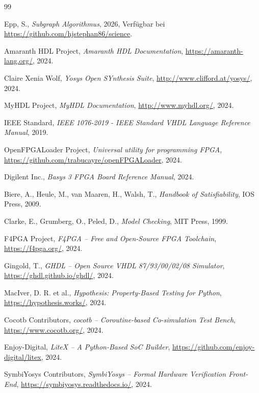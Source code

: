 ﻿\documentclass[12pt,a4paper]{report}
\begin{document}
\begin{thebibliography}{99}

  Epp, S.,
  \textit{Subgraph Algorithmus},
  2026, Verfügbar bei \url{https://github.com/hjstephan86/science}.

  Amaranth HDL Project,
  \textit{Amaranth HDL Documentation},
  \url{https://amaranth-lang.org/},
  2024.

  Claire Xenia Wolf,
  \textit{Yosys Open SYnthesis Suite},
  \url{http://www.clifford.at/yosys/},
  2024.

  MyHDL Project,
  \textit{MyHDL Documentation},
  \url{http://www.myhdl.org/},
  2024.

  IEEE Standard,
  \textit{IEEE 1076-2019 - IEEE Standard VHDL Language Reference Manual},
  2019.

  OpenFPGALoader Project,
  \textit{Universal utility for programming FPGA},
  \url{https://github.com/trabucayre/openFPGALoader},
  2024.

  Digilent Inc.,
  \textit{Basys 3 FPGA Board Reference Manual},
  2024.

  Biere, A., Heule, M., van Maaren, H., Walsh, T.,
  \textit{Handbook of Satisfiability},
  IOS Press, 2009.

  Clarke, E., Grumberg, O., Peled, D.,
  \textit{Model Checking},
  MIT Press, 1999.

  F4PGA Project,
  \textit{F4PGA -- Free and Open-Source FPGA Toolchain},
  \url{https://f4pga.org/},
  2024.

  Gingold, T.,
  \textit{GHDL -- Open Source VHDL 87/93/00/02/08 Simulator},
  \url{https://ghdl.github.io/ghdl/},
  2024.

  MacIver, D. R. et al.,
  \textit{Hypothesis: Property-Based Testing for Python},
  \url{https://hypothesis.works/},
  2024.

  Cocotb Contributors,
  \textit{cocotb -- Coroutine-based Co-simulation Test Bench},
  \url{https://www.cocotb.org/},
  2024.

  Enjoy-Digital,
  \textit{LiteX -- A Python-Based SoC Builder},
  \url{https://github.com/enjoy-digital/litex},
  2024.

  SymbiYosys Contributors,
  \textit{SymbiYosys -- Formal Hardware Verification Front-End},
  \url{https://symbiyosys.readthedocs.io/},
  2024.


\end{thebibliography}
\end{document}
